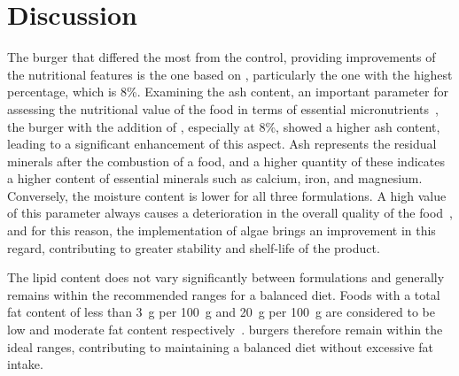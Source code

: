 \section{Discussion}
The burger that differed the most from the control, providing improvements of the nutritional features is the one based on , particularly the one with the highest percentage, which is \num{8}\%. Examining the ash content, an important parameter for assessing the nutritional value of the food in terms of essential micronutrients~\parencite{harris_Ash_2017}, the burger with the addition of , especially at \num{8}\%, showed a higher ash content, leading to a significant enhancement of this aspect. Ash represents the residual minerals after the combustion of a food, and a higher quantity of these indicates a higher content of essential minerals such as calcium, iron, and magnesium.
Conversely, the moisture content is lower for all three  formulations. A high value of this parameter always causes a deterioration in the overall quality of the food~\parencite{roudaut_Moisture_2010}, and for this reason, the implementation of algae brings an improvement in this regard, contributing to greater stability and shelf-life of the product.

The lipid content does not vary significantly between formulations and generally remains within the recommended ranges for a balanced diet. Foods with a total fat content of less than \qty{3}{\gram} per \qty{100}{\gram} and \qty{20}{\gram} per \qty{100}{\gram} are considered to be low and moderate fat content respectively~\parencite{who_2003}.  burgers therefore remain within the ideal ranges, contributing to maintaining a balanced diet without excessive fat intake.

